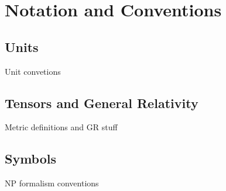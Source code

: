 
\chapter*{Notation and Conventions}

\section*{Units}

Unit convetions

\section*{Tensors and General Relativity}

Metric definitions and GR stuff

\section*{Symbols}

NP formalism conventions

\cleardoublepage